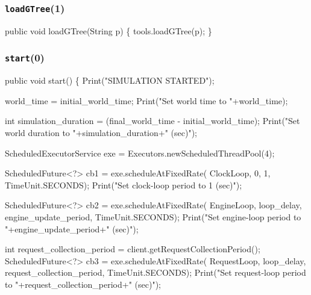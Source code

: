 \documentclass{article}
\def\nwendcode{\endtrivlist \endgroup}      %
\let\nwdocspar=\par
\begin{document}
\subsubsection{{\tt{}\protect{}loadGTree}(1)}
\nwenddocs{}\endmoddef{}
public void loadGTree(String p) \{
  tools.loadGTree(p);
\}
\eatline
{}\nwendcode{}\nwdocspar
\subsubsection{{\tt{}\protect{}start}(0)}
\nwenddocs{}\endmoddef{}
public void start() \{
  Print("SIMULATION STARTED");

  world_time = initial_world_time;
  Print("Set world time to "+world_time);

  int simulation_duration = (final_world_time - initial_world_time);
  Print("Set world duration to "+simulation_duration+" (sec)");

  ScheduledExecutorService exe = Executors.newScheduledThreadPool(4);

  ScheduledFuture<?> cb1 = exe.scheduleAtFixedRate(
    ClockLoop, 0, 1, TimeUnit.SECONDS);
  Print("Set clock-loop period to 1 (sec)");

  ScheduledFuture<?> cb2 = exe.scheduleAtFixedRate(
    EngineLoop, loop_delay, engine_update_period, TimeUnit.SECONDS);
  Print("Set engine-loop period to "+engine_update_period+" (sec)");

  int request_collection_period = client.getRequestCollectionPeriod();
  ScheduledFuture<?> cb3 = exe.scheduleAtFixedRate(
    RequestLoop, loop_delay, request_collection_period, TimeUnit.SECONDS);
  Print("Set request-loop period to "+request_collection_period+" (sec)");
\end{document}
